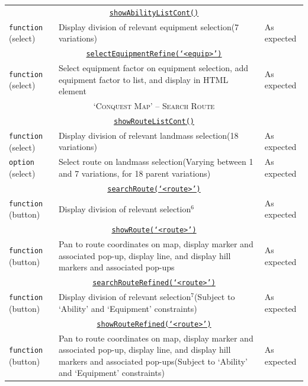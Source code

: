 \documentclass[11pt, english]{article}
\begin{document}
\begin{center}
\begin{longtable}{p{3cm}p{8cm}p{2cm}}
		\hline
		\multicolumn{3}{c}{\underline{\texttt{showAbilityListCont()}}}\\
		\texttt{function} (select) & Display division of relevant equipment selection\newline (7 variations) & As expected\\
		\multicolumn{3}{c}{\underline{\texttt{selectEquipmentRefine(`<equip>')}}}\\
		\texttt{function} (select) & Select equipment factor on equipment selection, add equipment factor to list, and display in HTML element & As expected\\
		\hline
		\multicolumn{3}{c}{\textsc{`Conquest Map' -- Search Route}}\\
		\hline
		\multicolumn{3}{c}{\underline{\texttt{showRouteListCont()}}}\\
		\texttt{function} (select) & Display division of relevant landmass selection\newline (18 variations) & As expected\\
		\texttt{option} (select) & Select route on landmass selection\newline (Varying between 1 and 7 variations, for 18 parent variations) & As expected\\
		\multicolumn{3}{c}{\underline{\texttt{searchRoute(`<route>')}}}\\
		\texttt{function} (button) & Display division of relevant selection$^{6}$ & As expected\\
		\multicolumn{3}{c}{\underline{\texttt{showRoute(`<route>')}}}\\
		\texttt{function} (button) & Pan to route coordinates on map, display marker and associated pop-up, display line, and display hill markers and associated pop-ups & As expected\\
		\multicolumn{3}{c}{\underline{\texttt{searchRouteRefined(`<route>')}}}\\
		\texttt{function} (button) & Display division of relevant selection$^{7}$\newline (Subject to `Ability' and `Equipment' constraints) & As expected\\
		\multicolumn{3}{c}{\underline{\texttt{showRouteRefined(`<route>')}}}\\
		\texttt{function} (button) & Pan to route coordinates on map, display marker and associated pop-up, display line, and display hill markers and associated pop-ups\newline (Subject to `Ability' and `Equipment' constraints) & As expected\\

\end{longtable}
\end{center}
\end{document}
